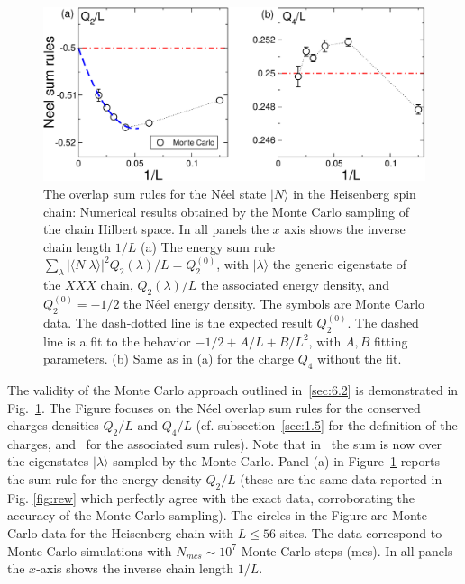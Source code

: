 \documentclass[11pt]{iopart}
\begin{document}
\begin{figure}[t]
\begin{center}
\includegraphics[width=.9\textwidth]{./draft_figs/QAMC_Obs_Neel}
\end{center}
\caption{The overlap sum rules for the N\'eel state $|N\rangle$ in the 
 Heisenberg spin chain: Numerical results obtained by the Monte Carlo 
 sampling of the chain Hilbert space. In all panels the $x$ axis shows 
 the inverse chain length $1/L$ (a) The energy sum rule $\sum_\lambda|
 \langle N|\lambda\rangle|^2Q_2(\lambda)/L=Q^{(0)}_2$, with $|\lambda
 \rangle$ the generic eigenstate of the $XXX$ chain, $Q_2(\lambda)/L$ 
 the associated energy density, and $Q_2^{(0)}=-1/2$ the N\'eel energy 
 density. The symbols are Monte Carlo data. The dash-dotted line is the 
 expected result $Q_2^{(0)}$. The dashed line is a fit to the behavior 
 $-1/2+A/L+B/L^2$, with $A,B$ fitting parameters.
 (b) Same as in (a) for the charge $Q_4$ without the fit. 
}
\label{fig3:Neel-qamc-sr}
\end{figure}


The validity of the Monte Carlo approach outlined in~\ref{sec:6.2} is demonstrated 
in Fig.~\ref{fig3:Neel-qamc-sr}. The Figure focuses on the N\'eel overlap 
sum rules for the conserved charges densities $Q_2/L$ and $Q_4/L$ (cf. 
subsection~\ref{sec:1.5} for the definition of the charges, and~ 
for the associated sum rules). 
%
Note that in~  the sum is now over the 
eigenstates $|\lambda\rangle$ sampled by the Monte Carlo. 
Panel (a) in Figure~\ref{fig3:Neel-qamc-sr} reports the sum rule for 
the energy density $Q_2/L$ (these are the same data reported in Fig. \ref{fig:rew} which 
perfectly agree with the exact data, corroborating the accuracy of the Monte Carlo sampling). 
The circles in the Figure are Monte Carlo data for the Heisenberg chain with $L\le 56$ 
sites. The data correspond to Monte Carlo simulations with $N_{mcs}\sim 10^7$ Monte 
Carlo steps (mcs). In all panels the $x$-axis shows the inverse chain length $1/L$. 
\end{document}
